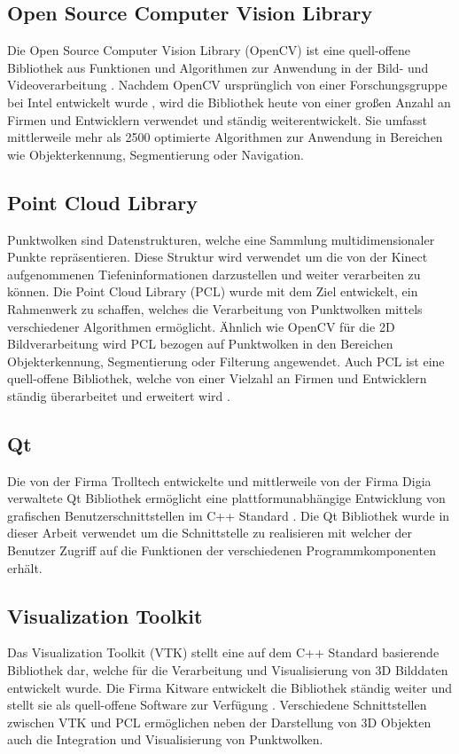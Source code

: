 \subsection{Open Source Computer Vision Library}
Die Open Source Computer Vision Library (OpenCV) ist eine quell-offene Bibliothek aus Funktionen und Algorithmen zur Anwendung in der Bild- und Videoverarbeitung \cite{OpenCV}. Nachdem OpenCV ursprünglich von einer Forschungsgruppe bei Intel entwickelt wurde \cite{Laganiere2011}, wird die Bibliothek heute von einer großen Anzahl an Firmen und Entwicklern verwendet und ständig weiterentwickelt. Sie umfasst mittlerweile mehr als 2500 optimierte Algorithmen zur Anwendung in Bereichen wie Objekterkennung, Segmentierung oder Navigation.

\subsection{Point Cloud Library}
Punktwolken sind Datenstrukturen, welche eine Sammlung multidimensionaler Punkte repräsentieren. Diese Struktur wird verwendet um die von der Kinect aufgenommenen Tiefeninformationen darzustellen und weiter verarbeiten zu können. Die Point Cloud Library (PCL) wurde mit dem Ziel entwickelt, ein Rahmenwerk zu schaffen, welches die Verarbeitung von Punktwolken mittels verschiedener Algorithmen ermöglicht. Ähnlich wie OpenCV für die 2D Bildverarbeitung wird PCL bezogen auf Punktwolken in den Bereichen Objekterkennung, Segmentierung oder Filterung angewendet. Auch PCL ist eine quell-offene Bibliothek, welche von einer Vielzahl an Firmen und Entwicklern ständig überarbeitet und erweitert wird \cite{PCL}.

\subsection{Qt}
Die von der Firma Trolltech entwickelte und mittlerweile von der Firma Digia verwaltete Qt Bibliothek ermöglicht eine plattformunabhängige Entwicklung von grafischen Benutzerschnittstellen im C++ Standard \cite{Qt}. Die Qt Bibliothek wurde in dieser Arbeit verwendet um die Schnittstelle zu realisieren mit welcher der Benutzer Zugriff auf die Funktionen der verschiedenen Programmkomponenten erhält.

\subsection{Visualization Toolkit}
Das Visualization Toolkit (VTK) stellt eine auf dem C++ Standard basierende Bibliothek dar, welche für die Verarbeitung und Visualisierung von 3D Bilddaten entwickelt wurde. Die Firma Kitware entwickelt die Bibliothek ständig weiter und stellt sie als quell-offene Software zur Verfügung \cite{VTK}. Verschiedene Schnittstellen zwischen VTK und PCL ermöglichen neben der Darstellung von 3D Objekten auch die Integration und Visualisierung von Punktwolken.

